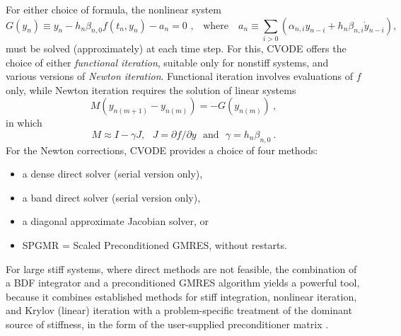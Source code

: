 For either choice of formula, the nonlinear system
\begin{equation}
G(y_n) \equiv y_n - h_n \beta_{n,0} f(t_n,y_n) - a_n = 0
  \mbox{~,~~~where~~~} a_n \equiv  
  \sum_{i>0}(\alpha_{n,i} y_{n-i} + h_n \beta_{n,i} \dot{y}_{n-i}),
\label{NLS} \end{equation}
must be solved (approximately) at each time step.  For this, CVODE
offers the choice of either {\em functional iteration}, suitable only
for nonstiff systems, and various versions of {\em Newton iteration}.
Functional iteration involves evaluations of $f$ only, while Newton
iteration requires the solution of linear systems
\begin{equation} M (y_{n(m+1)} - y_{n(m)}) = -G(y_{n(m)}) ~,
\label{Newtoncorr} \end{equation}
in which
\begin{equation} M \approx I - \gamma J, ~~~J = \partial f / \partial y 
                 ~~~ \mbox{and} ~~~\gamma = h_n \beta_{n,0} ~. 
\label{Newtonmat} \end{equation}
For the Newton corrections, CVODE provides a choice of four methods:
\begin{itemize}
\item a dense direct solver (serial version only),
\item a band direct solver (serial version only),
\item a diagonal approximate Jacobian solver, or
\item SPGMR = Scaled Preconditioned GMRES, without restarts.
\end{itemize}
For large stiff systems, where direct methods are not feasible, the
combination of a BDF integrator and a preconditioned GMRES algorithm
yields a powerful tool, because it combines established methods for
stiff integration, nonlinear iteration, and Krylov (linear) iteration
with a problem-specific treatment of the dominant source of stiffness,
in the form of the user-supplied preconditioner matrix \cite{BrHi:89}.


